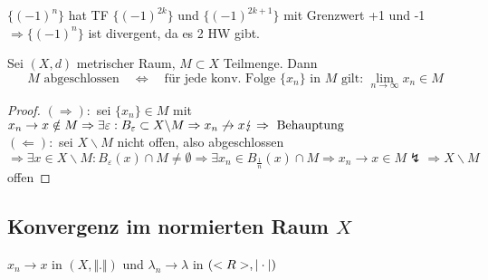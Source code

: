 \begin{example}
	$\{(-1)^n\}$ hat TF $\{(-1)^{2k}\}$ und $\{(-1)^{2k+1}\}$ mit Grenzwert +1 und -1 $\Rightarrow \{(-1)^n\}$ ist divergent, da es 2 HW gibt.
\end{example}

\begin{proposition}
	Sei $(X,d)$ metrischer Raum, $M\subset X$ Teilmenge. Dann
	\[ M\text{ abgeschlossen} \quad\Leftrightarrow\quad \text{für jede konv. Folge $\{x_n\}$ in $M$ gilt: }\lim\limits_{n\rightarrow\infty} x_n\in M \]
\end{proposition}
\begin{proof}
	$(\Rightarrow):$ sei $\{x_n\}\in M$ mit $x_n\to x\notin M\Rightarrow\exists\varepsilon:B_{\varepsilon}\subset X\backslash M\Rightarrow x_n\not\to x\lightning\Rightarrow \text{ Behauptung}$ \\
	$(\Leftarrow):$ sei $X\backslash M$ nicht offen, also abgeschlossen $\Rightarrow\exists x\in X\backslash M:B_{\varepsilon}(x)\cap M\neq\emptyset\Rightarrow\exists x_n\in B_{\frac{1}{n}}(x)\cap M\Rightarrow x_n\to x\in M\lightning\Rightarrow X\backslash M$ offen
\end{proof}

\subsection{Konvergenz im normierten Raum \texorpdfstring{$X$}{X}}
$x_n\to x$ in $(X,\Vert .\Vert)$ und $\lambda_n\to\lambda$ in $(<R>,\vert\cdot\vert)$

